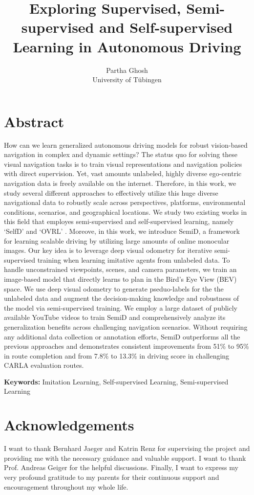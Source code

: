 \documentclass[letterpaper, 12pt]{book}
\author{Partha Ghosh\\University of Tübingen}
\date{}
\title{Exploring Supervised, Semi-supervised and Self-supervised Learning in Autonomous Driving}
\theoremstyle{definition}
\theoremstyle{definition}
\theoremstyle{definition}
\theoremstyle{definition}
\theoremstyle{definition}
\begin{document}
\maketitle


\chapter*{Abstract}
\label{sec:orgdd0c70d}
How can we learn generalized autonomous driving models for robust vision-based
 navigation in complex and dynamic settings? The status quo for solving these
 visual navigation tasks is to train visual representations and navigation
 policies with direct supervision.  Yet, vast amounts unlabeled, highly diverse
 ego-centric navigation data is freely available on the internet. Therefore, in
 this work, we study several different approaches to effectively utilize this
 huge diverse navigational data to robustly scale across perspectives,
 platforms, environmental conditions, scenarios, and geographical locations. We
 study two existing works in this field that employes semi-supervised and
 self-supervised learning, namely `SelfD' \cite{Zhang2022a} and `OVRL'
 \cite{Yadav2022}. Moreove, in this work, we introduce SemiD, a framework for
 learning scalable driving by utilizing large amounts of online monocular
 images. Our key idea is to leverage deep visual odometry for iterative
 semi-supervised training when learning imitative agents from unlabeled data. To
 handle unconstrained viewpoints, scenes, and camera parameters, we train an
 image-based model that directly learns to plan in the Bird’s Eye View (BEV)
 space. We use deep visual odometry to generate pseduo-labels for the the
 unlabeled data and augment the decision-making knowledge and robustness of the
 model via semi-supervised training. We employ a large dataset of publicly
 available YouTube videos to train SemiD and comprehensively analyze its
 generalization benefits across challenging navigation scenarios. Without
 requiring any additional data collection or annotation efforts, SemiD
 outperforms all the previous approaches and demonstrates consistent
 improvements from 51\% to 95\% in route completion and from 7.8\% to 13.3\% in
 driving score in challenging CARLA evaluation routes.

\textbf{Keywords:} Imitation Learning, Self-supervised Learning, Semi-supervised Learning

\clearpage 

\chapter*{Acknowledgements}
\label{sec:orgfaf7bbf}
I want to thank Bernhard Jaeger and Katrin Renz for supervising the project
and providing me with the necessary guidance and valuable support. I want to
thank Prof. Andreas Geiger for the helpful discussions. Finally, I want to
express my very profound gratitude to my parents for their continuous support
and encouragement throughout my whole life.
\end{document}
